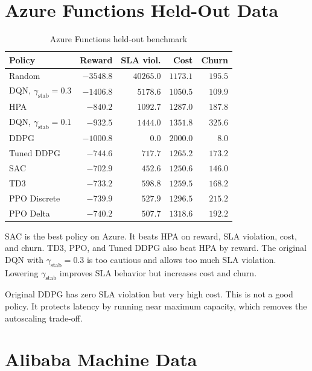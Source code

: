 \documentclass{rapportINPTCLOUD}
\newcommand{\best}[1]{\textbf{#1}}
\begin{document}
\section{Azure Functions Held-Out Data}

\begin{table}[H]
\centering
\small
\begin{tabular}{lrrrr}
\toprule
\textbf{Policy} & \textbf{Reward} & \textbf{SLA viol.} & \textbf{Cost} & \textbf{Churn} \\
\midrule
Random & $-3548.8$ & $40265.0$ & $1173.1$ & $195.5$ \\
DQN, $\gamma_{\text{stab}}=0.3$ & $-1406.8$ & $5178.6$ & $1050.5$ & $109.9$ \\
HPA & $-840.2$ & $1092.7$ & $1287.0$ & $187.8$ \\
DQN, $\gamma_{\text{stab}}=0.1$ & $-932.5$ & $1444.0$ & $1351.8$ & $325.6$ \\
DDPG & $-1000.8$ & $0.0$ & $2000.0$ & $8.0$ \\
Tuned DDPG & $-744.6$ & $717.7$ & $1265.2$ & $173.2$ \\
SAC & \best{$-702.9$} & $452.6$ & $1250.6$ & $146.0$ \\
TD3 & $-733.2$ & $598.8$ & $1259.5$ & $168.2$ \\
PPO Discrete & $-739.9$ & $527.9$ & $1296.5$ & $215.2$ \\
PPO Delta & $-740.2$ & $507.7$ & $1318.6$ & $192.2$ \\
\bottomrule
\end{tabular}
\caption{Azure Functions held-out benchmark}
\label{tab:azure}
\end{table}

SAC is the best policy on Azure. It beats HPA on reward, SLA violation, cost, and churn. TD3, PPO, and Tuned DDPG also beat HPA by reward. The original DQN with $\gamma_{\text{stab}}=0.3$ is too cautious and allows too much SLA violation. Lowering $\gamma_{\text{stab}}$ improves SLA behavior but increases cost and churn.

Original DDPG has zero SLA violation but very high cost. This is not a good policy. It protects latency by running near maximum capacity, which removes the autoscaling trade-off.

\section{Alibaba Machine Data}
\end{document}
